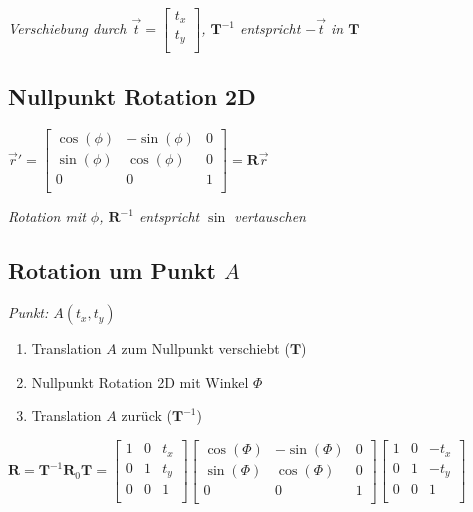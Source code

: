 \textit{Verschiebung durch $\vec{t} = \begin{bmatrix}
    t_x \\
    t_y \\
\end{bmatrix}$, $\mathbf{T}^{-1}$ entspricht $-\vec{t}$ in $\mathbf{T}$}

\subsection{Nullpunkt Rotation 2D}

$\vec{r}' = \left[\begin{array}{cc|c}
    \cos(\phi) & -\sin(\phi) & 0 \\
    \sin(\phi) & \cos(\phi) & 0 \\
    \hline
    0 & 0 & 1 \\
\end{array}\right] = \mathbf{R} \vec{r}$

\textit{Rotation mit $\phi$, $\mathbf{R}^{-1}$
entspricht $\sin$ vertauschen}

\subsection{Rotation um Punkt $A$}

\textit{Punkt: $A(t_x, t_y)$}

\begin{enumerate}
    \item Translation $A$ zum Nullpunkt verschiebt ($\mathbf{T}$)
    \item Nullpunkt Rotation 2D mit Winkel $\Phi$
    \item Translation $A$ zurück ($\mathbf{T}^{-1}$)
\end{enumerate}

$\mathbf{R} = \mathbf{T}^{-1} \mathbf{R}_0 \mathbf{T} = \begin{bmatrix}
    1 & 0 & t_x \\
    0 & 1 & t_y \\
    0 & 0 & 1 \\
\end{bmatrix} \begin{bmatrix}
    \cos(\Phi) & -\sin(\Phi) & 0 \\
    \sin(\Phi) & \cos(\Phi) & 0 \\
    0 & 0 & 1 \\
\end{bmatrix} \begin{bmatrix}
    1 & 0 & -t_x \\
    0 & 1 & -t_y \\
    0 & 0 & 1 \\
\end{bmatrix}$

